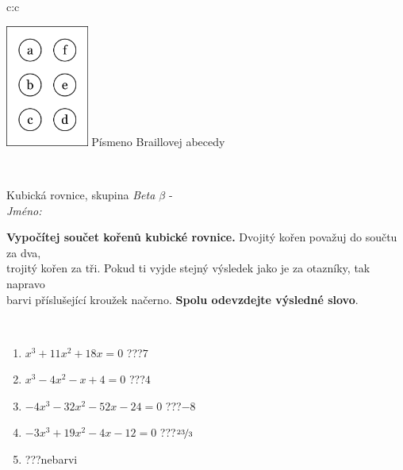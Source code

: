 \documentclass[10pt]{report}
\begin{document}
\begin{tabular}{c:c}
\begin{minipage}[c][104.5mm][t]{0.5\linewidth}
\begin{center}
\begin{minipage}{0.20\linewidth}
\begin{center}
\includegraphics[height=40mm]{../images/braille.png}
{\small Písmeno Braillovej abecedy}
\end{center}
\end{minipage}
\end{center}
\end{minipage}
\\ \hdashline
\begin{minipage}[c][104.5mm][t]{0.5\linewidth}
\begin{center}
\vspace{7mm}
{\huge Kubická rovnice, skupina \textit{Beta $\beta$} -}\\[5mm]
\textit{Jméno:}\phantom{xxxxxxxxxxxxxxxxxxxxxxxxxxxxxxxxxxxxxxxxxxxxxxxxxxxxxxxxxxxxxxxxx}\\[5mm]
\begin{minipage}{0.95\linewidth}
\begin{center}
\textbf{Vypočítej součet kořenů kubické rovnice.} Dvojitý kořen považuj do součtu za dva,\\trojitý kořen za tři. Pokud ti vyjde stejný výsledek jako je za otazníky, tak napravo\\barvi příslušející kroužek načerno. \textbf{Spolu odevzdejte výsledné slovo}.
\end{center}
\end{minipage}
\\[1mm]
\begin{minipage}{0.79\linewidth}
\begin{center}
\begin{varwidth}{\linewidth}
\begin{enumerate}
\Large
\item $x^3+11x^2+18x=0$\quad \dotfill\; ???\;\dotfill \quad $7$
\item $x^3-4x^2-x+4=0$\quad \dotfill\; ???\;\dotfill \quad $4$
\item $-4x^3-32x^2-52x-24=0$\quad \dotfill\; ???\;\dotfill \quad $-8$
\item $-3x^3+19x^2-4x-12=0$\quad \dotfill\; ???\;\dotfill \quad $\nicefrac{23}{3}$
\item \quad \dotfill\; ???\;\dotfill \quad nebarvi

\end{enumerate}
\end{varwidth}
\end{center}
\end{minipage}
\end{center}
\end{minipage}
\end{tabular}
\end{document}
